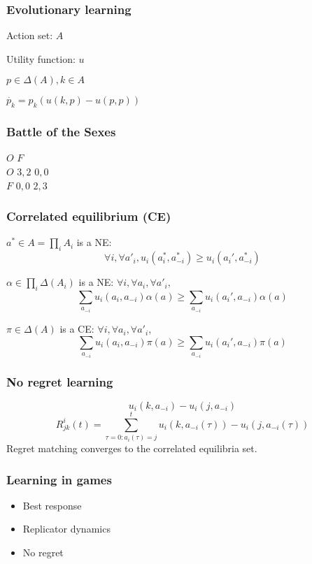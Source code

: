 \begin{frame}
  \frametitle{Evolutionary learning}
  \pause
  Action set: $A$

  Utility function: $u$

  \pause
  \bigskip
  $p \in \Delta(A), k \in A$

  $\dot{p_k} = p_k\left(u(k, p) - u(p, p)\right)$
\end{frame}

\begin{frame}
  \frametitle{Battle of the Sexes}

  \pause
  \begin{game}{2}{2}
      \> $O$     \> $F$    \\
    $O$ \> $3, 2$  \> $0, 0$ \\
    $F$ \> $0, 0$  \> $2, 3$ \\
  \end{game}
\end{frame}

\begin{frame}
  \frametitle{Correlated equilibrium (CE)}
  \pause
  $a^* \in A = \prod_iA_i$ is a NE:
  \[\forall i, \forall a'_i, u_i(a_i^*, a_{-i}^*) \ge u_i(a_i', a_{-i}^*)\]

  \pause
  $\alpha \in \prod_i\Delta(A_i)$ is a NE: $\forall i, \forall a_i, \forall a'_i,$
  \[\sum_{a_{-i}} u_i(a_i, a_{-i}) \alpha(a) \ge
  \sum_{a_{-i}} u_i(a_i',
  a_{-i}) \alpha(a) \]

  \pause
  $\pi \in \Delta(A)$ is a CE: $\forall i, \forall a_i, \forall a'_i,$
  \[\sum_{a_{-i}} u_i(a_i, a_{-i}) \pi(a) \ge
  \sum_{a_{-i}} u_i(a_i', a_{-i}) \pi(a) \]
\end{frame}

\begin{frame}
  \frametitle{No regret learning}
  \pause
  \[u_i(k, a_{-i}) - u_i(j, a_{-i})\]
  \pause
  \[R^i_{jk}(t) = \sum_{\tau = 0: a_i(\tau) = j}^t u_i(k, a_{-i}(\tau)) - u_i(j,
  a_{-i}(\tau))\]
  \pause
  Regret matching converges to the correlated equilibria set.
\end{frame}

\begin{framestruct}
  \frametitle{Learning in games}

  \begin{itemize}
  \pause \item Best response
  \pause \item Replicator dynamics
  \pause \item No regret
  \end{itemize}

\end{framestruct}
